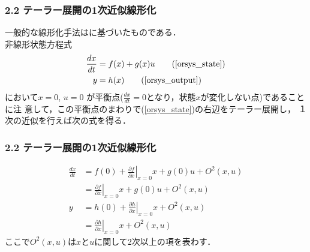 \begin{frame}[t]
\frametitle{2.2 テーラー展開の1次近似線形化}
一般的な線形化手法はに基づいたものである．\\
非線形状態方程式
\begin{align}
 \frac{dx}{dt} &= f(x) + g(x) u \tag{\ref{orsys_state}} \\
 y             &= h(x) \tag{\ref{orsys_output}}
\end{align}
において$x=0$, $u=0$
が平衡点($\frac{dx}{dt} = 0$となり，状態$x$が変化しない点)であることに注
意して，この平衡点のまわりで(\ref{orsys_state})の右辺をテーラー展開し，
１次の近似を行えば次の式を得る．
\end{frame}

\begin{frame}[t]
\frametitle{2.2 テーラー展開の1次近似線形化}
\begin{align}
 \frac{dx}{dt} 
 &= f(0) + \left. \frac{\partial f}{\partial x} \right \vert _{x=0} x
 + g(0) u + O^2 (x, u) \nonumber \\
 &= \left. \frac{\partial f}{\partial x} \right \vert _{x=0} x
 + g(0) u + O^2 (x, u)
 \label{app1_state_p}
\\
 y 
 &= h(0) + \left. \frac{\partial h}{\partial x} \right \vert _{x=0} x
 + O^2 (x, u)
 \nonumber \\
 &= \left. \frac{\partial h}{\partial x} \right \vert _{x=0} x
 + O^2 (x, u)
\end{align}
ここで$O^2(x, u)$は$x$と$u$に関して2次以上の項を表わす．
\end{frame}

